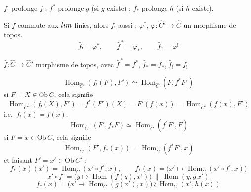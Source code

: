 \documentclass[11pt,a4paper]{article}
\begin{document}


$f_{!}$ prolonge $f$ ; $f^{*}$ prolonge $g$ (si $g$ existe) ; $f_{*}$ prolonge $h$
(si $h$ existe).

Si $f$ commute aux $\varprojlim$ finies, alors $f_{!}$ aussi ;
\struck{\ill{}} $\varphi^{*}$, $\varphi : \widehat{C}' \to \widehat{C}$ un
morphisme de topos.
\[
\widehat{f}_{!} = \varphi^{*}, \qquad
\widehat{f}^{\,*} = \varphi_{*}, \qquad
\widehat{f}_{*} = \varphi^{!}
\]

$\widehat{f} : \widehat{C} \to \widehat{C}'$ morphisme de topos, avec
$\widehat{f}^{\,*} = f^{*}$, $\widehat{f}_{*} = f_{*}$, $\widehat{f}_{!} = f_{!}$.

\[
\operatorname{Hom}_{\widehat{C}'}(f_{!}(F), F') \simeq
\operatorname{Hom}_{\widehat{C}}(F, f^{*}F')
\]
si $F = X \in \mathrm{Ob}\,C$, cela signifie
\[
\operatorname{Hom}_{\widehat{C}'}(f_{!}(X), F') = f^{*}(F')(X) = F'(f(x))
= \operatorname{Hom}_{\widehat{C}'}(f(x), F')
\]
i.e.\ $f_{!}(x) = f(x)$.
\[
\operatorname{Hom}_{\widehat{C}'}(F', f_{*}F) \simeq
\operatorname{Hom}_{\widehat{C}}(f^{*}F', F)
\]
si $F = x \in \mathrm{Ob}\,C$, cela signifie
\[
\operatorname{Hom}_{\widehat{C}'}(F', f_{*}(x)) =
\operatorname{Hom}_{\widehat{C}}(f^{*}F', x)
\]
et faisant $F' = x' \in \mathrm{Ob}\,C'$ :
\struck{\ill{}}
\[
f_{*}(x)(x') = \operatorname{Hom}_{\widehat{C}}
(x' \circ f^{\circ}, x), \qquad
f_{*}(x) = \bigl( x' \longmapsto \operatorname{Hom}_{\widehat{C}}
(x' \circ f^{\circ}, x) \bigr)
\]
\[
x' \circ f^{\circ} = \bigl( y \longmapsto \operatorname{Hom}(f(y), x') \bigr)
\ \parallel\ \operatorname{Hom}(y, g\,x')
\]
\[
f_{*}(x) = \bigl( x' \longmapsto \operatorname{Hom}_{C}(g(x'), x) \bigr)
\ \wr\ \operatorname{Hom}_{C}(x', h(x))
\]
\end{document}
